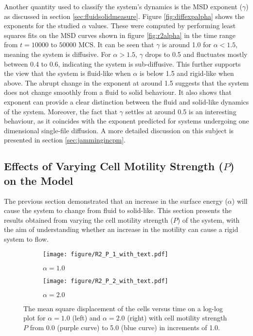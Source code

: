 \documentclass[a4paper,12pt]{article}
\begin{document}
Another quantity used to classify the system's dynamics is the MSD exponent ($\gamma$) as discussed in section \ref{sec:fluidsolidmeasure}. Figure \ref{fig:diffexpalpha} shows the exponents for the studied $\alpha$ values. These were computed by performing least squares fits on the MSD curves shown in figure \ref{fig:r2alpha} in the time range from $t = 10000$ to $50000$ MCS. It can be seen that $\gamma$ is around 1.0 for $\alpha < 1.5$, meaning the system is diffusive. For $\alpha > 1.5$, $\gamma$ drops to 0.5 and fluctuates mostly between 0.4 to 0.6, indicating the system is sub-diffusive. This further supports the view that the system is fluid-like when $\alpha$ is below 1.5 and rigid-like when above. The abrupt change in the exponent at around 1.5 suggests that the system does not change smoothly from a fluid to solid behaviour. It also shows that exponent can provide a clear distinction between the fluid and solid-like dynamics of the system. Moreover, the fact that $\gamma$ settles at around 0.5 is an interesting behaviour, as it coincides with the exponent predicted for systems undergoing one dimensional single-file diffusion. A more detailed discussion on this subject is presented in section \ref{sec:jammingincpm}.


\subsection{Effects of Varying Cell Motility Strength ($P$) on the Model}
The previous section demonstrated that an increase in the surface energy ($\alpha$) will cause the system to change from fluid to solid-like. This section presents the results obtained from varying the cell motility strength ($P$) of the system, with the aim of understanding whether an increase in the motility can cause a rigid system to flow.

\begin{figure}[h]
\centering
\begin{subfigure}[h]{0.496\textwidth}
\texttt{[image: figure/R2\_P\_1\_with\_text.pdf]}
\caption*{$\alpha = 1.0$}
\end{subfigure}
\begin{subfigure}[h]{0.496\textwidth}
\texttt{[image: figure/R2\_P\_2\_with\_text.pdf]}
\caption*{$\alpha = 2.0$}
\end{subfigure}
\caption{The mean square displacement of the cells versus time on a log-log plot for $\alpha = 1.0$ (left) and $\alpha = 2.0$ (right) with cell motility strength $P$ from 0.0 (purple curve) to 5.0 (blue curve) in increments of 1.0.}
\label{fig:r2p}
\end{figure}
\end{document}
